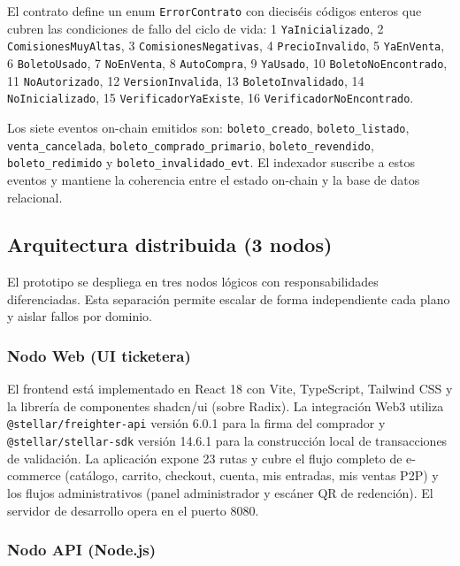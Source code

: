 El contrato define un enum \texttt{ErrorContrato} con dieciséis códigos enteros que cubren las condiciones de fallo del ciclo de vida: 1 \texttt{YaInicializado}, 2 \texttt{ComisionesMuyAltas}, 3 \texttt{ComisionesNegativas}, 4 \texttt{PrecioInvalido}, 5 \texttt{YaEnVenta}, 6 \texttt{BoletoUsado}, 7 \texttt{NoEnVenta}, 8 \texttt{AutoCompra}, 9 \texttt{YaUsado}, 10 \texttt{BoletoNoEncontrado}, 11 \texttt{NoAutorizado}, 12 \texttt{VersionInvalida}, 13 \texttt{BoletoInvalidado}, 14 \texttt{NoInicializado}, 15 \texttt{VerificadorYaExiste}, 16 \texttt{VerificadorNoEncontrado}.

Los siete eventos on-chain emitidos son: \texttt{boleto\_creado}, \texttt{boleto\_listado}, \texttt{venta\_cancelada}, \texttt{boleto\_comprado\_primario}, \texttt{boleto\_revendido}, \texttt{boleto\_redimido} y \texttt{boleto\_invalidado\_evt}. El indexador suscribe a estos eventos y mantiene la coherencia entre el estado on-chain y la base de datos relacional.

\subsection{Arquitectura distribuida (3 nodos)}

El prototipo se despliega en tres nodos lógicos con responsabilidades diferenciadas. Esta separación permite escalar de forma independiente cada plano y aislar fallos por dominio.

\subsubsection{Nodo Web (UI ticketera)}

El frontend está implementado en React 18 con Vite, TypeScript, Tailwind CSS y la librería de componentes shadcn/ui (sobre Radix). La integración Web3 utiliza \texttt{@stellar/freighter-api} versión 6.0.1 para la firma del comprador y \texttt{@stellar/stellar-sdk} versión 14.6.1 para la construcción local de transacciones de validación. La aplicación expone 23 rutas y cubre el flujo completo de e-commerce (catálogo, carrito, checkout, cuenta, mis entradas, mis ventas P2P) y los flujos administrativos (panel administrador y escáner QR de redención). El servidor de desarrollo opera en el puerto 8080.

\subsubsection{Nodo API (Node.js)}

